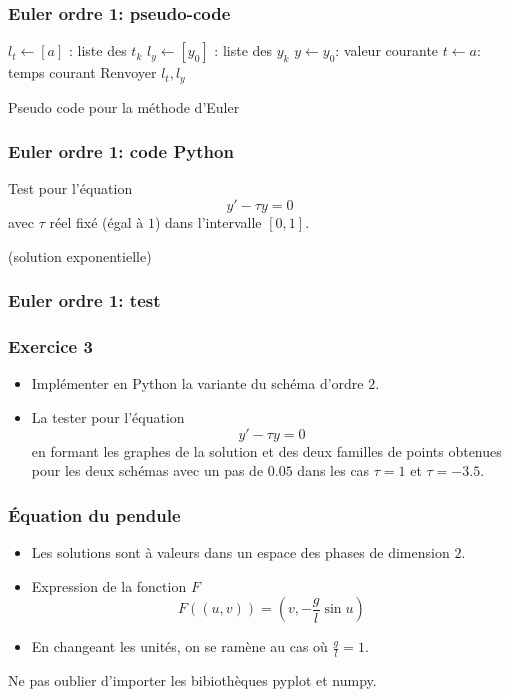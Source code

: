 \begin{frame}
  \frametitle{Euler ordre 1: pseudo-code}
\begin{algorithm}[H]
  $l_t\leftarrow [a]$ : liste des $t_k$\;
  $l_y\leftarrow [y_0]$ : liste des $y_k$\;
  $y\leftarrow y_0$: valeur courante \;
  $t\leftarrow a$: temps courant \;
  Renvoyer $l_t , l_y$\;
  \caption{Pseudo code pour la méthode d'Euler}
  \label{resolnumeqdiff_1}
\end{algorithm}
\end{frame}

\begin{frame}
  \frametitle{Euler ordre 1: code Python}

\end{frame}

\begin{frame}
Test pour l'équation
\begin{equation}
  y' - \tau y =0
  \label{eqtau}
\end{equation}
avec $\tau$ réel fixé (égal à $1$) dans l'intervalle $[0,1]$.

(solution exponentielle)
  \frametitle{Euler ordre 1: test}

\end{frame}

\begin{frame}
  \frametitle{Exercice 3}
\begin{itemize}
  \item Implémenter en Python la variante du schéma d'ordre $2$.
  \item La tester pour l'équation
\begin{equation*}
  y' - \tau y =0
\end{equation*}
en formant les graphes de la solution et des deux familles de points obtenues pour les deux schémas avec un pas de $0.05$ dans les cas $\tau=1$ et $\tau=-3.5$.
\end{itemize}
\end{frame}

\begin{frame}
  \frametitle{\'Equation du pendule}
\begin{itemize}
  \item Les solutions sont à valeurs dans un espace des phases de dimension $2$.
  \item Expression de la fonction $F$
\begin{displaymath}
  F((u,v)) = (v,-\frac{g}{l}\sin u)
\end{displaymath}
  \item En changeant les unités, on se ramène au cas où $\frac{g}{l}=1$. 
\end{itemize}
Ne pas oublier d'importer les bibiothèques pyplot et numpy.
\end{frame}

